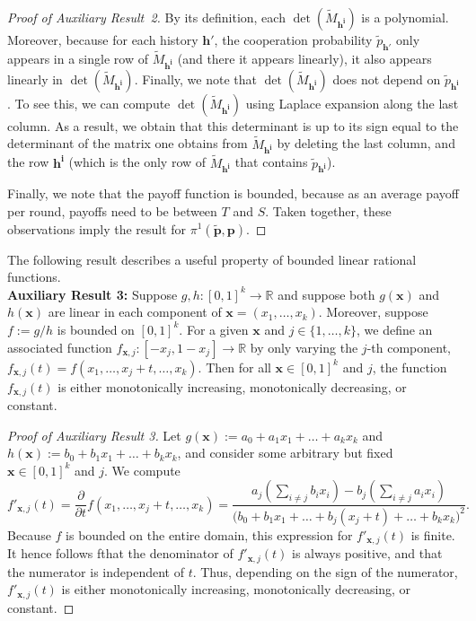 \documentclass[11pt]{article}
\theoremstyle{plainCl1}
\theoremstyle{plainCl2}
\begin{document}
\begin{proof}[Proof of Auxiliary Result~2]
By its definition, each $\det(\tilde M_\mathbf{h^i})$ is a polynomial. Moreover, because for each history $\mathbf{h'}$, the cooperation probability $\tilde p_\mathbf{h'}$ only appears in a single row of $\tilde M_\mathbf{h^i}$ (and there it appears linearly), it also appears linearly in  $\det(\tilde M_\mathbf{h^i})$. Finally, we note that $\det(\tilde M_\mathbf{h^i})$ does not depend on $\tilde p_\mathbf{h^i}$. To see this, we can compute $\det(\tilde M_\mathbf{h^i})$ using Laplace expansion along the last column. As a result, we obtain that this determinant is up to its sign equal to the determinant of the matrix one obtains from $\tilde M_\mathbf{h^i}$ by deleting the last column, and the row $\mathbf{h^i}$ (which is the only row of $\tilde M_\mathbf{h^i}$ that contains $\tilde p_\mathbf{h^i}$). 

Finally, we note that the payoff function is bounded, because as an average payoff per round, payoffs need to be between $T$ and $S$. Taken together, these observations imply the result for $\pi^1(\mathbf{\tilde p},\mathbf{p})$. 
\end{proof}

\noindent
The following result describes a useful property of bounded linear rational functions.\\

\noindent
{\bf Auxiliary Result 3:} Suppose $g,h:[0,1]^{k}\!\rightarrow\! \mathbb{R}$ and suppose both $g(\mathbf{x})$ and $h(\mathbf{x})$ are linear in each component of $\mathbf{x}\!=\!(x_1,\ldots,x_k)$. 
Moreover, suppose $f\!:=\!g/h$ is bounded on $[0,1]^{k}$. 
For a given $\mathbf{x}$ and $j\!\in\!\{1,\ldots,k\}$, we define an associated function $f_{\mathbf{x},j}:[-x_j,1\!-\!x_j]\to\mathbb{R}$ by only varying the $j$-th component, $f_{\mathbf{x},j}(t) = f(x_1,\ldots,x_j+t,\ldots,x_k)$. Then for all $\mathbf{x}\!\in\![0,1]^k$ and $j$, the function  $f_{\mathbf{x},j}(t)$ is either monotonically increasing, monotonically decreasing, or constant.

\begin{proof}[Proof of Auxiliary Result 3]
Let $g(\mathbf{x}):=a_0\!+\!a_1x_1\!+\!\ldots \!+\!a_k x_k$ and $h(\mathbf{x}):=b_0\!+\!b_1x_1\!+\!\ldots \!+\!b_k x_k$, and consider some arbitrary but fixed $\mathbf{x}\!\in\![0,1]^k$ and $j$. We compute
\begin{equation}
f'_{\mathbf{x},j}(t) = \frac{\partial}{\partial t}  f(x_1,\ldots,x_j+t,\ldots,x_k) = \frac{a_j\left( \sum_{i\neq j} b_i x_i\right) - b_j \left(\sum_{i\neq j} a_i x_i\right)}{\big(b_0+b_1x_1+\ldots+b_j(x_j+t)+\ldots+b_kx_k\big)^2}.
\end{equation}
Because $f$ is bounded on the entire domain, this expression for $f'_{\mathbf{x},j}(t)$ is finite. It hence follows fthat the denominator of $f'_{\mathbf{x},j}(t)$ is always positive, and that the numerator is independent of $t$. Thus, depending on the sign of the numerator, $f'_{\mathbf{x},j}(t)$ is either monotonically increasing, monotonically decreasing, or constant. 
\end{proof}
\end{document}

